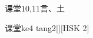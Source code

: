 \begin{entry}{课堂}{10,11}{⾔、⼟}
  \begin{phonetics}{课堂}{ke4 tang2}[][HSK 2]
  \end{phonetics}
\end{entry}

